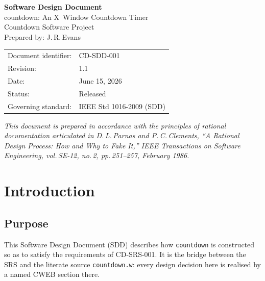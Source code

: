 \documentclass[12pt]{article}
\newcommand{\code}[1]{\texttt{#1}}
\begin{document}
\begin{titlepage}
  \centering
  \vspace*{2cm}
  {\Huge\bfseries\color{cdteal} Software Design Document\\[0.5em]}
  {\Large countdown: An X~Window Countdown Timer}\\[2em]
  {\large Countdown Software Project}\\[0.5em]
  {\normalsize Prepared by: J.\,R.\,Evans}\\[2em]
  \begin{tabular}{ll}
    Document identifier: & CD-SDD-001                                     \\
    Revision:            & 1.1                                            \\
    Date:                & June 15, 2026                                  \\
    Status:              & Released                                       \\
    Governing standard:  & IEEE Std 1016-2009 (SDD)                       \\
  \end{tabular}
  \vfill
  {\small\textit{This document is prepared in accordance with the
  principles of rational documentation articulated in
  D.\,L.\,Parnas and P.\,C.\,Clements, ``A Rational Design Process:
  How and Why to Fake It,'' \textit{IEEE Transactions on Software
  Engineering}, vol.\,SE-12, no.\,2, pp.\,251--257, February 1986.}}
\end{titlepage}

\tableofcontents
\clearpage

\section{Introduction}

\subsection{Purpose}

This Software Design Document (SDD) describes how \code{countdown} is
constructed so as to satisfy the requirements of CD-SRS-001.  It is the
bridge between the SRS and the literate source \code{countdown.w}: every
design decision here is realised by a named CWEB section there.
\end{document}
